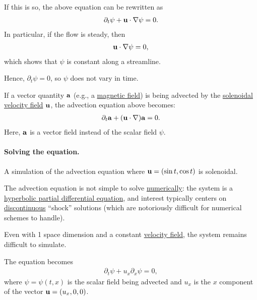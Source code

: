 \documentclass{article}
\begin{document}
If this is so, the above equation can be rewritten as
\begin{align*}
	\partial_t\psi + {\bf u}\cdot\nabla\psi = 0.
\end{align*}
In particular, if the flow is steady, then
\begin{align*}
	{\bf u}\cdot\nabla\psi = 0,
\end{align*}
which shows that $\psi$ is constant along a streamline.

Hence, $\partial_t\psi = 0$, so $\psi$ does not vary in time.

%
If a vector quantity ${\bf a}$ (e.g., a \href{https://en.wikipedia.org/wiki/Magnetic_field}{magnetic field}) is being advected by the \href{https://en.wikipedia.org/wiki/Solenoidal}{solenoidal} \href{https://en.wikipedia.org/wiki/Velocity_field}{velocity field} ${\bf u}$, the advection equation above becomes: 
\begin{align*}
	\partial_t{\bf a} + ({\bf u}\cdot\nabla){\bf a} = 0.
\end{align*}
Here, ${\bf a}$ is a vector field instead of the scalar field $\psi$.

\paragraph{Solving the equation.} \textsf{A simulation of the advection equation where ${\bf u} = (\sin t,\cos t)$ is solenoidal.}

%
The advection equation is not simple to solve \href{https://en.wikipedia.org/wiki/Numerical_analysis}{numerically}: the system is a \href{https://en.wikipedia.org/wiki/Hyperbolic_partial_differential_equation}{hyperbolic partial differential equation}, and interest typically centers on \href{https://en.wikipedia.org/wiki/Continuous_function}{discontinuous} ``shock'' solutions (which are notoriously difficult for numerical schemes to handle).

%
Even with 1 space dimension and a constant \href{https://en.wikipedia.org/wiki/Velocity_field}{velocity field}, the system remains difficult to simulate.

The equation becomes
\begin{align*}
	\partial_t\psi + u_x\partial_x\psi = 0,
\end{align*}
where $\psi = \psi(t,x)$ is the scalar field being advected and $u_x$ is the $x$ component of the vector ${\bf u} = (u_x,0,0)$.
\end{document}
